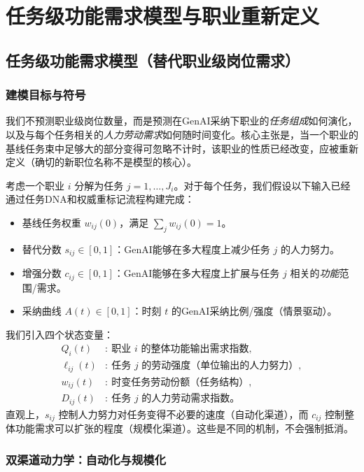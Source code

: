 \section{任务级功能需求模型与职业重新定义}
\label{sec:task_level_model}

\subsection{任务级功能需求模型（替代职业级岗位需求）}
\subsubsection{建模目标与符号}
\label{sec:notation}
我们不预测职业级岗位数量，而是预测在GenAI采纳下职业的\emph{任务组成}如何演化，以及与每个任务相关的\emph{人力劳动需求}如何随时间变化。核心主张是，当一个职业的基线任务束中足够大的部分变得可忽略不计时，该职业的性质已经改变，应被重新定义（确切的新职位名称不是模型的核心）。

考虑一个职业 $i$ 分解为任务 $j=1,\dots,J_i$。对于每个任务，我们假设以下输入已经通过任务DNA和权威重标记流程构建完成：
\begin{itemize}
  \item 基线任务权重 $w_{ij}(0)$，满足 $\sum_{j} w_{ij}(0)=1$。
  \item 替代分数 $s_{ij}\in[0,1]$：GenAI能够在多大程度上减少任务 $j$ 的人力努力。
  \item 增强分数 $c_{ij}\in[0,1]$：GenAI能够在多大程度上扩展与任务 $j$ 相关的\emph{功能}范围/需求。
  \item 采纳曲线 $A(t)\in[0,1]$：时刻 $t$ 的GenAI采纳比例/强度（情景驱动）。
\end{itemize}

我们引入四个状态变量：
\begin{align*}
Q_i(t) &:\ \text{职业 } i \text{ 的整体功能输出需求指数},\\
\ell_{ij}(t) &:\ \text{任务 } j \text{ 的劳动强度（单位输出的人力努力）},\\
w_{ij}(t) &:\ \text{时变任务劳动份额（任务结构）},\\
D_{ij}(t) &:\ \text{任务 } j \text{ 的人力劳动需求指数}。
\end{align*}
直观上，$s_{ij}$ 控制人力努力对任务变得不必要的速度（自动化渠道），而 $c_{ij}$ 控制整体功能需求可以扩张的程度（规模化渠道）。这些是不同的机制，不会强制抵消。

\subsubsection{双渠道动力学：自动化与规模化}
\label{sec:two_channel}

